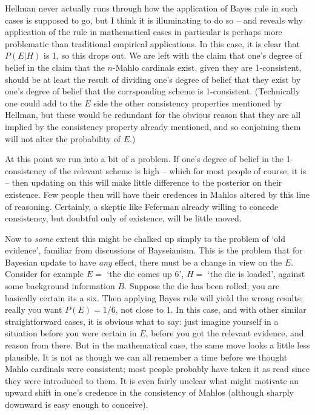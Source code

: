 \documentclass{asl}
\theoremstyle{definition}
\begin{document}
Hellman never actually runs through how the application of Bayes rule in 
such cases is supposed to go, but I think it is illuminating to do so 
-- and reveals why application of the rule in mathematical cases in particular 
is perhaps more problematic than traditional empirical applications. 
In this case, it is clear that $P(E|H)$ is 1, so this drops out. 
We are left with the claim that one's degree of belief in the claim that 
the $n$-Mahlo cardinals exist, given they are 1-consistent, should be at least 
the result of dividing one's degree of belief that they exist by 
one's degree of belief that the corrsponding scheme is 1-consistent. (Technically
one could add to the $E$ side the other consistency properties mentioned by Hellman,
but these would be redundant for the obvious reason that they are all implied by 
the consistency property already mentioned, and so conjoining them
will not alter the probability of $E$.)

At this point we run into a bit of a problem. If one's degree of belief 
in the 1-consistency of the relevant scheme is high -- which for most people 
of course, it is -- then updating on this will make little difference to the 
posterior on their existence. Few people then will have their credences in 
Mahlos altered by this line of reasoning. Certainly, a skeptic like Feferman already
willing to concede consistency, but doubtful only of existence, will be little moved.

Now to \emph{some} extent this might be chalked up simply to the problem of 
`old evidence', familiar from discussions of Bayseianism. This is the 
problem that for Bayesian update to have \emph{any} effect, there must be a 
change in view on the $E$. Consider for example $E =$ `the die comes up 6', 
$H =$ `the die is loaded', against some background information $B$. Suppose 
the die has been rolled; you are basically certain its a six. Then applying 
Bayes rule will yield the wrong results; really you want $P(E) = 1/6$, 
not close to $1$. In this case, and with other similar straightforward cases, 
it is obvious what to say: just imagine yourself in a situation before you were 
certain in $E$, before you got the relevant evidence, and reason from there. 
But in the mathematical case, the same move looks a little less plausible. It 
is not as though we can all remember a time before we thought Mahlo cardinals 
were consistent; most people probably have taken it as read since they were 
introduced to them. It is even fairly unclear what might motivate an upward shift 
in one's credence in the consistency of Mahlos (although sharply downward is 
easy enough to conceive).
\end{document}
